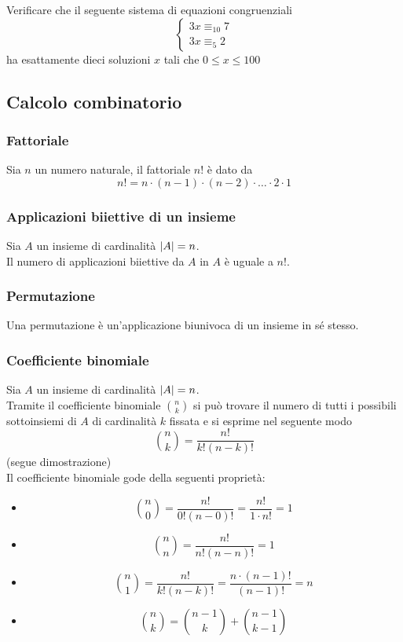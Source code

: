 \begin{flushleft}
\begin{esercizio}
Verificare che il seguente sistema di equazioni congruenziali
\[\begin{cases}
3x\equiv_{10} 7\\
3x\equiv_{5} 2
\end{cases}
\]
ha esattamente dieci soluzioni $x$ tali che $0\leq x \leq 100$
\end{esercizio}
\vspace{200px}



\subsection{Calcolo combinatorio}
\subsubsection{Fattoriale}
Sia $n$ un numero naturale, il fattoriale $n!$ è dato da
\[n! = n\cdot (n-1)\cdot(n-2)\cdot\hdots\cdot2\cdot1\]
\subsubsection{Applicazioni biiettive di un insieme}
Sia $A$ un insieme di cardinalità $\abs{A} = n$.\\
Il numero di applicazioni biiettive da $A$ in $A$ è uguale a $n!$.
\subsubsection{Permutazione}
Una permutazione è un'applicazione biunivoca di un insieme in sé stesso.
\subsubsection{Coefficiente binomiale}
Sia $A$ un insieme di cardinalità $\abs{A} = n$.\\
Tramite il coefficiente binomiale $\binom{n}{k}$ si può trovare il numero di tutti i possibili sottoinsiemi di $A$ di cardinalità $k$ fissata e si esprime nel seguente modo
 \[
       \binom{n}{k} = \frac{n!}{k!(n-k)!}
    \]
(segue dimostrazione)
\\ \vspace{150px}
Il coefficiente binomiale gode della seguenti proprietà:
\begin{itemize}
    \item  \[
       \binom{n}{0} = \frac{n!}{0!(n-0)!} = \frac{n!}{1\cdot n!} = 1
    \]
    \item  \[
       \binom{n}{n} = \frac{n!}{n!(n-n)!} = 1
    \]
    \item  \[
       \binom{n}{1} = \frac{n!}{k!(n-k)!} = \frac{n\cdot (n-1)!}{(n-1)!} = n
    \]
    \item  \[
       \binom{n}{k} = \binom{n-1}{k} + \binom{n-1}{k-1}
    \]                
\end{itemize}

\end{flushleft}
